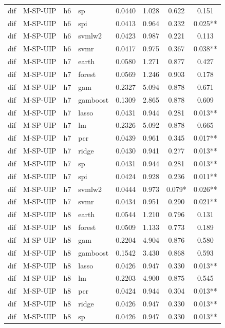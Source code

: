 \begin{ThreePartTable}
\begin{longtable}[t]{llclcccc}
dif & M-SP-UIP & h6 & sp & 0.0440 & 1.028 & 0.622 & 0.151\\
dif & M-SP-UIP & h6 & spi & 0.0413 & 0.964 & 0.332 & 0.025**\\
dif & M-SP-UIP & h6 & svmlw2 & 0.0423 & 0.987 & 0.221 & 0.113\\
dif & M-SP-UIP & h6 & svmr & 0.0417 & 0.975 & 0.367 & 0.038**\\
\addlinespace
dif & M-SP-UIP & h7 & earth & 0.0580 & 1.271 & 0.877 & 0.427\\
dif & M-SP-UIP & h7 & forest & 0.0569 & 1.246 & 0.903 & 0.178\\
dif & M-SP-UIP & h7 & gam & 0.2327 & 5.094 & 0.878 & 0.671\\
dif & M-SP-UIP & h7 & gamboost & 0.1309 & 2.865 & 0.878 & 0.609\\
dif & M-SP-UIP & h7 & lasso & 0.0431 & 0.944 & 0.281 & 0.013**\\
dif & M-SP-UIP & h7 & lm & 0.2326 & 5.092 & 0.878 & 0.665\\
dif & M-SP-UIP & h7 & pcr & 0.0439 & 0.961 & 0.345 & 0.017**\\
dif & M-SP-UIP & h7 & ridge & 0.0430 & 0.941 & 0.277 & 0.013**\\
dif & M-SP-UIP & h7 & sp & 0.0431 & 0.944 & 0.281 & 0.013**\\
dif & M-SP-UIP & h7 & spi & 0.0424 & 0.928 & 0.236 & 0.011**\\
dif & M-SP-UIP & h7 & svmlw2 & 0.0444 & 0.973 & 0.079* & 0.026**\\
dif & M-SP-UIP & h7 & svmr & 0.0434 & 0.951 & 0.290 & 0.021**\\
\addlinespace
dif & M-SP-UIP & h8 & earth & 0.0544 & 1.210 & 0.796 & 0.131\\
dif & M-SP-UIP & h8 & forest & 0.0509 & 1.133 & 0.773 & 0.189\\
dif & M-SP-UIP & h8 & gam & 0.2204 & 4.904 & 0.876 & 0.580\\
dif & M-SP-UIP & h8 & gamboost & 0.1542 & 3.430 & 0.868 & 0.593\\
dif & M-SP-UIP & h8 & lasso & 0.0426 & 0.947 & 0.330 & 0.013**\\
dif & M-SP-UIP & h8 & lm & 0.2203 & 4.900 & 0.875 & 0.545\\
dif & M-SP-UIP & h8 & pcr & 0.0424 & 0.944 & 0.304 & 0.013**\\
dif & M-SP-UIP & h8 & ridge & 0.0426 & 0.947 & 0.330 & 0.013**\\
dif & M-SP-UIP & h8 & sp & 0.0426 & 0.947 & 0.330 & 0.013**\\

\end{longtable}
\end{ThreePartTable}
